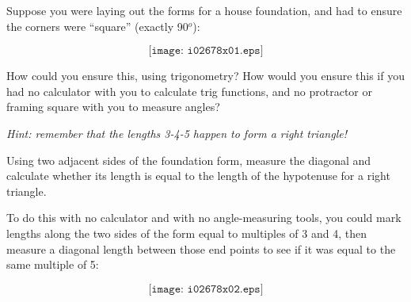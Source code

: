 

Suppose you were laying out the forms for a house foundation, and had to ensure the corners were ``square'' (exactly 90$^{o}$):

$$\texttt{[image: i02678x01.eps]}$$

How could you ensure this, using trigonometry?  How would you ensure this if you had no calculator with you to calculate trig functions, and no protractor or framing square with you to measure angles?  

\vskip 10pt

{\it Hint: remember that the lengths 3-4-5 happen to form a right triangle!}







Using two adjacent sides of the foundation form, measure the diagonal and calculate whether its length is equal to the length of the hypotenuse for a right triangle.

\vskip 10pt

To do this with no calculator and with no angle-measuring tools, you could mark lengths along the two sides of the form equal to multiples of 3 and 4, then measure a diagonal length between those end points to see if it was equal to the same multiple of 5:

$$\texttt{[image: i02678x02.eps]}$$











